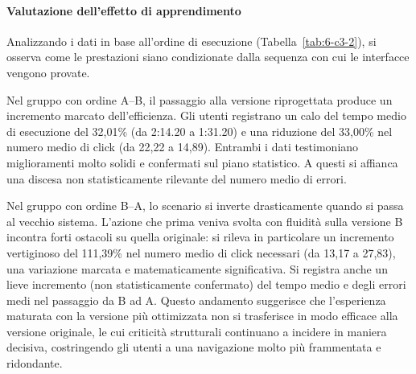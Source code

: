 \paragraph{Valutazione dell'effetto di apprendimento}

Analizzando i dati in base all'ordine di esecuzione (Tabella~\ref{tab:6-c3-2}), si osserva come le prestazioni siano condizionate dalla sequenza con cui le interfacce vengono provate.

Nel gruppo con ordine A--B, il passaggio alla versione riprogettata produce un incremento marcato dell'efficienza. Gli utenti registrano un calo del tempo medio di esecuzione del 32,01\% (da 2:14.20 a 1:31.20) e una riduzione del 33,00\% nel numero medio di click (da 22,22 a 14,89). Entrambi i dati testimoniano miglioramenti molto solidi e confermati sul piano statistico. A questi si affianca una discesa non statisticamente rilevante del numero medio di errori.

Nel gruppo con ordine B--A, lo scenario si inverte drasticamente quando si passa al vecchio sistema. L'azione che prima veniva svolta con fluidità sulla versione B incontra forti ostacoli su quella originale: si rileva in particolare un incremento vertiginoso del 111,39\% nel numero medio di click necessari (da 13,17 a 27,83), una variazione marcata e matematicamente significativa. Si registra anche un lieve incremento (non statisticamente confermato) del tempo medio e degli errori medi nel passaggio da B ad A. Questo andamento suggerisce che l’esperienza maturata con la versione più ottimizzata non si trasferisce in modo efficace alla versione originale, le cui criticità strutturali continuano a incidere in maniera decisiva, costringendo gli utenti a una navigazione molto più frammentata e ridondante.

